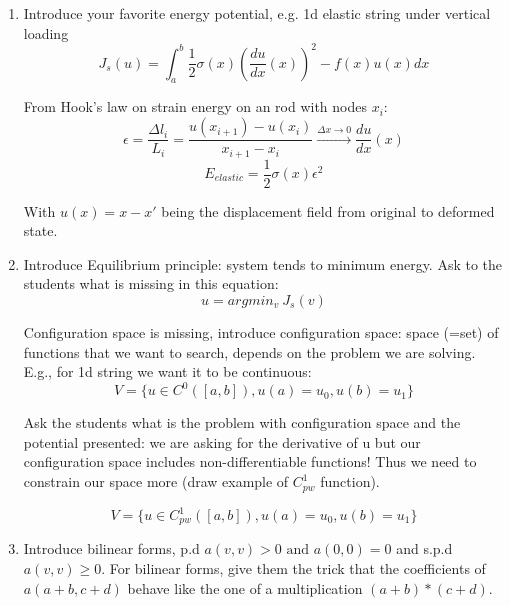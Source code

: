 \begin{enumerate}
    \item 
Introduce your favorite energy potential, e.g. 1d elastic string under vertical loading
\begin{equation}
    J_s(u) = \int_a^b \frac{1}{2}\sigma(x) (\frac{du}{dx}(x))^2 - f(x)u(x) dx
\end{equation}

From Hook's law on strain energy on an rod with nodes $x_i$:
\begin{equation}
    \epsilon = \frac{\Delta l_i}{L_i} = \frac{u(x_{i+1}) - u(x_i)}{x_{i+1} - x_i} \xrightarrow{\Delta x \rightarrow 0} \frac{du}{dx}(x)
\end{equation}
\begin{equation}
    E_{elastic} = \frac{1}{2}\sigma(x)\epsilon^2
\end{equation}

With $u(x) = x - x'$ being the displacement field from original to deformed state.

\item
Introduce Equilibrium principle: system tends to minimum energy. Ask to the students what is missing in this equation:
\begin{equation}
    u = argmin_v \ J_s(v)
\end{equation}

Configuration space is missing, introduce configuration space: space (=set) of functions that we want to search, depends on the problem we are solving. E.g., for 1d string we want it to be continuous:
\begin{equation}
    V = \{u \in C^0([a, b]), u(a) = u_0, u(b) = u_1\}
\end{equation}

Ask the students what is the problem with configuration space and the potential presented: we are asking for the derivative of u but our configuration space includes non-differentiable functions!
Thus we need to constrain our space more (draw example of $C^1_{pw}$ function).

\begin{equation}
    V = \{u \in C^1_{pw}([a,b]), u(a) = u_0, u(b) = u_1\}
\end{equation}

\item Introduce bilinear forms, p.d $a(v,v) > 0 \text{ and } a(0, 0) = 0$ and s.p.d $a(v,v) \geq 0$. For bilinear forms, give them the trick that the coefficients of $a(a+b, c+d)$ behave like the one of a multiplication $(a+b)*(c+d)$.

\end{enumerate}



